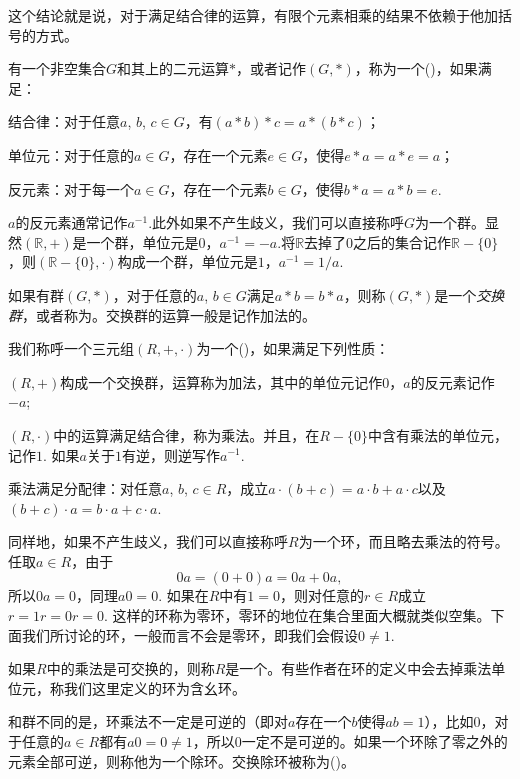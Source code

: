 这个结论就是说，对于满足结合律的运算，有限个元素相乘的结果不依赖于他加括号的方式。

\begin{para}
有一个非空集合$G$和其上的二元运算$*$，或者记作$(G,*)$，称为一个()，如果满足：

\begin{compactenum}
\item 结合律：对于任意$a$, $b$, $c\in G$，有$(a*b)*c=a*(b*c)$；
\item 单位元：对于任意的$a\in G$，存在一个元素$e\in G$，使得$e*a=a*e=a$；
\item 反元素：对于每一个$a\in G$，存在一个元素$b\in G$，使得$b*a=a*b=e$.
\end{compactenum}

$a$的反元素通常记作$a^{-1}$.此外如果不产生歧义，我们可以直接称呼$G$为一个群。显然$(\mathbb{R},+)$是一个群，单位元是0，$a^{-1}=-a$.将$\mathbb{R}$去掉了$0$之后的集合记作$\mathbb{R}-\{0\}$，则$(\mathbb{R}-\{0\},\cdot)$构成一个群，单位元是$1$，$a^{-1}=1/a$.

如果有群$(G,*)$，对于任意的$a$, $b\in G$满足$a*b=b*a$，则称$(G,*)$是一个\textit{交换群}，或者称为。交换群的运算一般是记作加法的。
\end{para}

\begin{para}
我们称呼一个三元组$(R,+,\cdot)$为一个()，如果满足下列性质：

\begin{compactenum}
\item $(R,+)$构成一个交换群，运算称为加法，其中的单位元记作$0$，$a$的反元素记作$-a$;
\item $(R,\cdot)$中的运算满足结合律，称为乘法。并且，在$R-\{0\}$中含有乘法的单位元，记作$1$. 如果$a$关于$1$有逆，则逆写作$a^{-1}$.
\item 乘法满足分配律：对任意$a$, $b$, $c \in R$，成立$a\cdot(b+c)=a\cdot b+a\cdot c$以及$(b+c)\cdot a=b\cdot a+c\cdot a$.
\end{compactenum}

同样地，如果不产生歧义，我们可以直接称呼$R$为一个环，而且略去乘法的符号。任取$a\in R$，由于
\[
	0a=(0+0)a=0a+0a,
\]
所以$0a=0$，同理$a0=0$. 如果在$R$中有$1=0$，则对任意的$r\in R$成立$r=1r=0r=0$. 这样的环称为零环，零环的地位在集合里面大概就类似空集。下面我们所讨论的环，一般而言不会是零环，即我们会假设$0\neq 1$.

如果$R$中的乘法是可交换的，则称$R$是一个。有些作者在环的定义中会去掉乘法单位元，称我们这里定义的环为含幺环。

和群不同的是，环乘法不一定是可逆的（即对$a$存在一个$b$使得$ab=1$），比如$0$，对于任意的$a\in R$都有$a0=0\neq 1$，所以$0$一定不是可逆的。如果一个环除了零之外的元素全部可逆，则称他为一个除环。交换除环被称为()。
\end{para}

